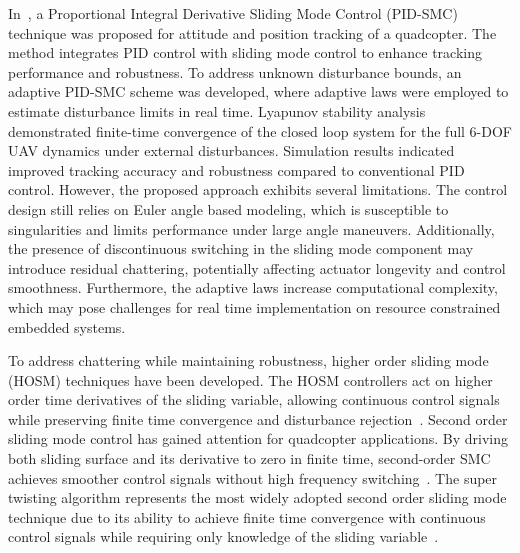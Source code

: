 \noindent In~\cite{mofid2020adaptive}, a Proportional Integral Derivative Sliding Mode Control (PID-SMC) technique was proposed for attitude and position tracking of a quadcopter. The method integrates PID control with sliding mode control to enhance tracking performance and robustness. To address unknown disturbance bounds, an adaptive PID-SMC scheme was developed, where adaptive laws were employed to estimate disturbance limits in real time. Lyapunov stability analysis demonstrated finite-time convergence of the closed loop system for the full 6-DOF UAV dynamics under external disturbances. Simulation results indicated improved tracking accuracy and robustness compared to conventional PID control. However, the proposed approach exhibits several limitations. The control design still relies on Euler angle based modeling, which is susceptible to singularities and limits performance under large angle maneuvers. Additionally, the presence of discontinuous switching in the sliding mode component may introduce residual chattering, potentially affecting actuator longevity and control smoothness. Furthermore, the adaptive laws increase computational complexity, which may pose challenges for real time implementation on resource constrained embedded systems.


To address chattering while maintaining robustness, higher order sliding mode (HOSM) techniques have been developed. The HOSM controllers act on higher order time derivatives of the sliding variable, allowing continuous control signals while preserving finite time convergence and disturbance rejection~\cite{abera2024improved,kashi2025finite}. Second order sliding mode control has gained attention for quadcopter applications. By driving both sliding surface and its derivative to zero in finite time, second-order SMC achieves smoother control signals without high frequency switching~\cite{labbadi2020novel,abera2024improved}. The super twisting algorithm represents the most widely adopted second order sliding mode technique due to its ability to achieve finite time convergence with continuous control signals while requiring only knowledge of the sliding variable~\cite{gedefaw2024improved,labbadi2020novel,abera2024improved}.



